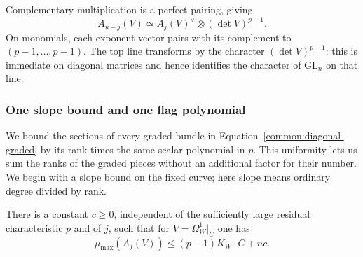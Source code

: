 Complementary multiplication is a perfect pairing, giving
\begin{equation}\label{common:socle-pairing}
 A_{u-j}(V)\simeq A_j(V)^\vee\otimes(\det V)^{p-1}.
\end{equation}
On monomials, each exponent vector pairs with its complement to
$(p-1,\ldots,p-1)$.  The top line transforms by the character
$(\det V)^{p-1}$: this is immediate on diagonal matrices and hence
 identifies the character of $\mathrm{GL}_n$ on that line.

\subsubsection{One slope bound and one flag polynomial}

We bound the sections of every graded bundle in
Equation~\eqref{common:diagonal-graded} by its rank times the same scalar
polynomial in $p$. This uniformity lets us sum the ranks of the
graded pieces without an additional factor for their number.
We begin with a slope bound on the fixed curve; here slope means
ordinary degree divided by rank.

\begin{lemma}\label{common:truncated-slope}
There is a constant $c\ge0$, independent of the sufficiently large
residual characteristic $p$ and of $j$, such that for
$V=\Omega_W^1|_C$ one has
\[
 \mu_{\max}(A_j(V))\le(p-1)K_W\cdot C+nc.
\]
\end{lemma}


